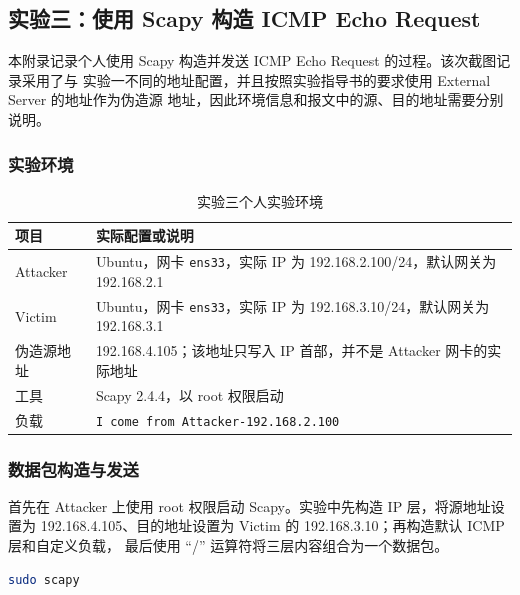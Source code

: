 
\subsection{实验三：使用 Scapy 构造 ICMP Echo Request}

本附录记录个人使用 Scapy 构造并发送 ICMP Echo Request 的过程。该次截图记录采用了与
实验一不同的地址配置，并且按照实验指导书的要求使用 External Server 的地址作为伪造源
地址，因此环境信息和报文中的源、目的地址需要分别说明。

\clearpage
\subsubsection{实验环境}

\begin{table}[H]
    \centering
    \caption{实验三个人实验环境}
    \label{tab:jly-task3-environment}
    \small
    \renewcommand{\arraystretch}{1.35}
    \begin{tabularx}{\linewidth}{>{\raggedright\arraybackslash}p{2.8cm}X}
        \toprule
        项目 & 实际配置或说明 \\
        \midrule
        Attacker & Ubuntu，网卡 \texttt{ens33}，实际 IP 为 192.168.2.100/24，默认网关为 192.168.2.1 \\
        Victim & Ubuntu，网卡 \texttt{ens33}，实际 IP 为 192.168.3.10/24，默认网关为 192.168.3.1 \\
        伪造源地址 & 192.168.4.105；该地址只写入 IP 首部，并不是 Attacker 网卡的实际地址 \\
        工具 & Scapy 2.4.4，以 root 权限启动 \\
        负载 & \texttt{I come from Attacker-192.168.2.100} \\
        \bottomrule
    \end{tabularx}
\end{table}

\subsubsection{数据包构造与发送}

首先在 Attacker 上使用 root 权限启动 Scapy。实验中先构造 IP 层，将源地址设置为
192.168.4.105、目的地址设置为 Victim 的 192.168.3.10；再构造默认 ICMP 层和自定义负载，
最后使用 ``/'' 运算符将三层内容组合为一个数据包。

\begin{lstlisting}[language=bash,caption={以 root 权限启动 Scapy}]
sudo scapy
\end{lstlisting}

